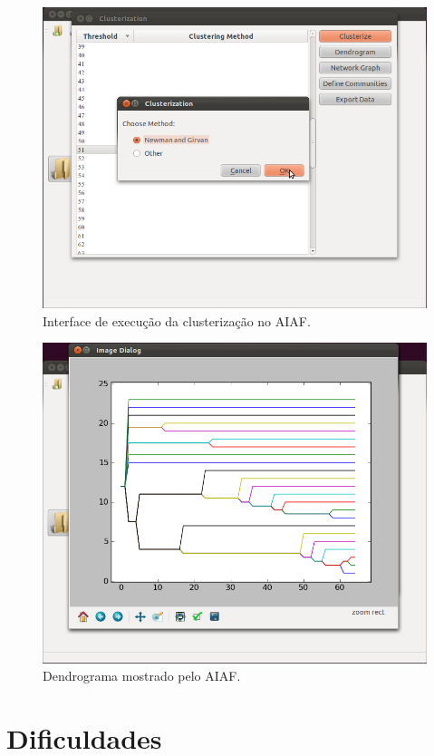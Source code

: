 \begin{figure}
\centering
\includegraphics[scale=0.38]{clustering-gui}
\caption{Interface de execução da clusterização no AIAF.}
\label{fig:clustering-gui}
\end{figure}

\begin{figure}
\centering
\includegraphics[scale=0.38]{navi-dendrogram}
\caption{Dendrograma mostrado pelo AIAF.}
\label{fig:navi-dendrogram}
\end{figure}

\section{Dificuldades} \label{sec:dificuldades}

